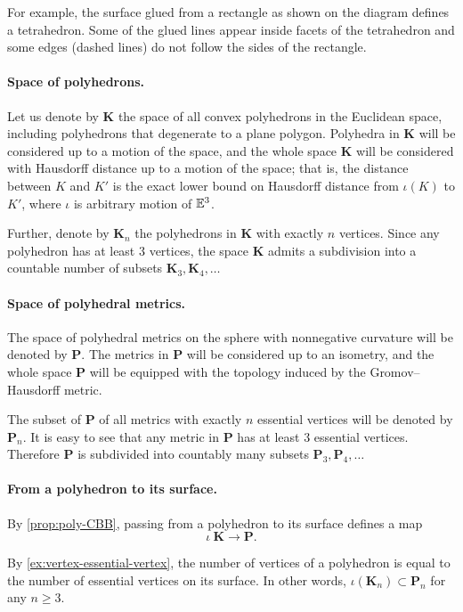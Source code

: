 For example, the surface glued from a rectangle as shown on the diagram defines a tetrahedron.
Some of the glued lines appear inside facets of the tetrahedron and some edges (dashed lines) do not follow the sides of the rectangle.

\paragraph{Space of polyhedrons.}
Let us denote by $\mathbf{K}$ the space of all convex polyhedrons in the Euclidean space,
including polyhedrons that degenerate to a plane polygon.
Polyhedra in $\mathbf{K}$ will be considered up to a motion of the space, 
and the whole space $\mathbf{K}$ will be considered with Hausdorff distance up to a motion of the space;
that is, the distance between $K$ and $K'$ is the exact lower bound on Hausdorff distance from $\iota(K)$ to $K'$, where $\iota$ is arbitrary motion of $\mathbb{E}^3$.

Further, denote by $\mathbf{K}_n$ the polyhedrons in $\mathbf{K}$ with exactly $n$ vertices.
Since any polyhedron has at least 3 vertices, the space $\mathbf{K}$ admits a subdivision into a countable number of subsets $\mathbf{K}_3,\mathbf{K}_4,\dots$

\paragraph{Space of polyhedral metrics.}
The space of polyhedral metrics on the sphere with nonnegative curvature will be denoted by $\mathbf{P}$.
The metrics in $\mathbf{P}$ will be considered up to an isometry, and the whole space $\mathbf{P}$ will be equipped with the topology induced by the Gromov--Hausdorff metric.

The subset of $\mathbf{P}$ of all metrics with exactly $n$ essential vertices will be denoted by $\mathbf{P}_n$.
It is easy to see that any metric in $\mathbf{P}$ has at least 3 essential vertices.
Therefore $\mathbf{P}$ is subdivided into countably many subsets
 $\mathbf{P}_3,\mathbf{P}_4,\dots$

\paragraph{From a polyhedron to its surface.}

By \ref{prop:poly-CBB}, passing from a polyhedron to its surface defines a map
\[\iota\:\mathbf{K}\to \mathbf{P}.\]

By \ref{ex:vertex-essential-vertex}, the number of vertices of a polyhedron is equal to the number of essential vertices on its surface.
In other words, $\iota(\mathbf{K}_n)\subset \mathbf{P}_n$ for any $n\ge 3$.

